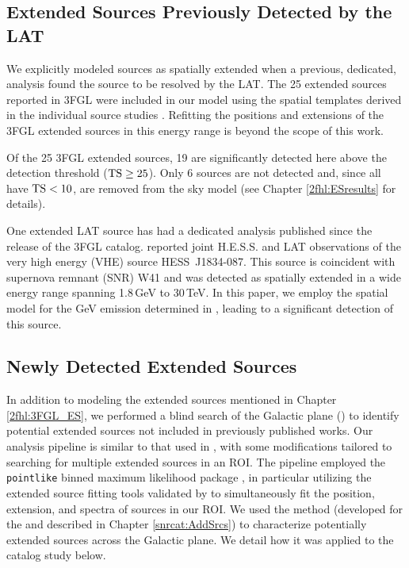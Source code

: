 \subsection{\label{2fhl:3FGL_ES}Extended Sources Previously Detected by the LAT}
We explicitly modeled sources as spatially extended when a previous, dedicated, analysis found the source to be resolved by the LAT.
The 25 extended sources reported in 3FGL were included in our model using the spatial templates derived in the individual source studies \citep[see references in ][]{3FGL}. Refitting the positions and extensions of the 3FGL extended sources in this energy range is beyond the scope of this work.

Of the 25 3FGL extended sources, 19 are significantly detected here above the detection threshold (${\rm TS}\geq25$). Only 6 sources are not detected and, since all have  ${\rm TS<10}$, are removed from the sky model (see Chapter \ref{2fhl:ESresults} for details).

One extended LAT source has had a dedicated analysis published since the release of the 3FGL catalog. \cite{HESSLATW41} reported joint H.E.S.S. and LAT observations of the very high energy (VHE) source HESS~J1834-087. This source is coincident with supernova remnant (SNR) W41 and was detected  as spatially extended in a wide energy range spanning 1.8\,GeV to 30\,TeV. In this paper, we employ the spatial model for the GeV emission determined in \cite{HESSLATW41}, leading to a significant detection of this source.


%
%
\subsection{\label{2fhl:newES}Newly Detected Extended Sources} %

In addition to modeling the extended sources mentioned in Chapter \ref{2fhl:3FGL_ES}, we performed a blind search of the Galactic plane  (\blat) to identify potential extended sources not included in previously published works. Our analysis pipeline is similar to that used in \cite{snrCat}, with some modifications tailored to searching for multiple extended sources in an ROI. The pipeline employed the {\tt pointlike} binned maximum likelihood package \citep{Kerr10}, in particular utilizing the extended source fitting tools validated by \cite{Lande12} to simultaneously fit the position, extension, and spectra of sources in our ROI. We used the \srcs{} method (developed for the \snrcat{} and described in Chapter \ref{snrcat:AddSrcs}) to characterize potentially extended sources across the Galactic plane. We detail how it was applied to the \twofhl{} catalog study below.

